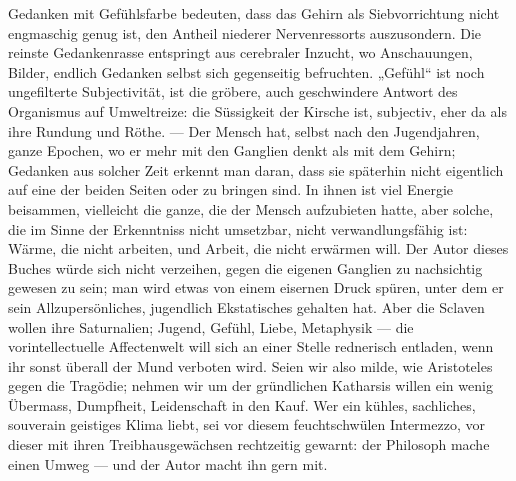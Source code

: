 Gedanken mit Gefühlsfarbe bedeuten, dass das Gehirn als Siebvorrichtung nicht engmaschig genug ist, den Antheil niederer Nervenressorts auszusondern. Die reinste Gedankenrasse entspringt aus cerebraler Inzucht, wo Anschauungen, Bilder, endlich Gedanken selbst sich gegenseitig befruchten. „Gefühl“ ist noch ungefilterte Subjectivität, ist die gröbere, auch geschwindere Antwort des Organismus auf Umweltreize: die Süssigkeit der Kirsche ist, subjectiv, eher da als ihre Rundung und Röthe. — Der Mensch hat, selbst nach den Jugendjahren, ganze Epochen, wo er mehr mit den Ganglien denkt als mit dem Gehirn; Gedanken aus solcher Zeit erkennt man daran, dass sie späterhin nicht eigentlich auf eine der beiden Seiten  oder  zu bringen sind. In ihnen ist viel Energie beisammen, vielleicht die ganze, die der Mensch aufzubieten hatte, aber solche, die im Sinne der Erkenntniss nicht umsetzbar, nicht verwandlungsfähig ist: Wärme, die nicht arbeiten, und Arbeit, die nicht erwärmen will. Der Autor dieses Buches würde sich nicht verzeihen, gegen die eigenen Ganglien zu nachsichtig gewesen zu sein; man wird etwas von einem eisernen Druck spüren, unter dem er sein Allzupersönliches, jugendlich Ekstatisches gehalten hat. Aber die Sclaven wollen ihre Saturnalien; Jugend, Gefühl, Liebe, Metaphysik — die vorintellectuelle Affectenwelt will sich an einer Stelle rednerisch entladen, wenn ihr sonst überall der Mund verboten wird. Seien wir also milde, wie Aristoteles gegen die Tragödie; nehmen wir um der gründlichen Katharsis willen ein wenig Übermass, Dumpfheit, Leidenschaft in den Kauf. Wer ein kühles, sachliches, souverain geistiges Klima liebt, sei vor diesem feuchtschwülen Intermezzo, vor dieser  mit ihren Treibhausgewächsen rechtzeitig gewarnt: der Philosoph mache einen Umweg — und der Autor macht ihn gern mit.
\par

